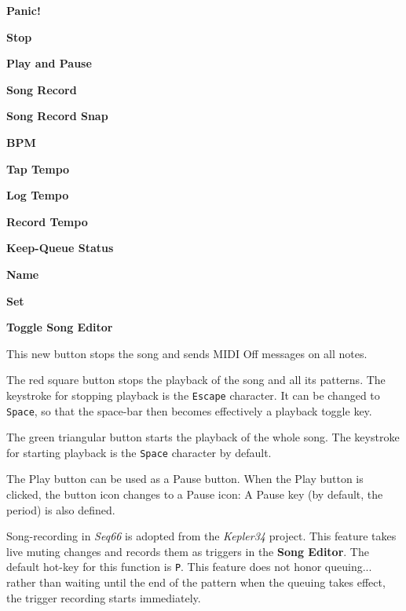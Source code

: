    \begin{enumber}
      \item \textbf{Panic!}
      \item \textbf{Stop}
      \item \textbf{Play and Pause}
      \item \textbf{Song Record}
      \item \textbf{Song Record Snap}
      \item \textbf{BPM}
      \item \textbf{Tap Tempo}
      \item \textbf{Log Tempo}
      \item \textbf{Record Tempo}
      \item \textbf{Keep-Queue Status}
      \item \textbf{Name}
      \item \textbf{Set}
      \item \textbf{Toggle Song Editor}
   \end{enumber}

   \setcounter{ItemCounter}{0}      %

   This new button stops the song and sends MIDI Off messages on all notes.

   The red square button stops the playback of the song and all its patterns.
   The keystroke for stopping playback is the \texttt{Escape} character.
   It can be changed to \texttt{Space}, so that the space-bar then becomes
   effectively a playback toggle key.

   The green triangular button starts the playback of the whole song.
   The keystroke for starting playback is the \texttt{Space} character by
   default.

   The Play button can be used as a Pause button.
   When the Play button is clicked, the button icon changes to a Pause icon:
   A Pause key (by default, the period) is also defined.

   Song-recording in \textsl{Seq66} is adopted from the
   \textsl{Kepler34} project.
   This feature takes live muting changes and records them as
   triggers in the \textbf{Song Editor}.
   The default hot-key for this function is \texttt{P}.
   This feature does not honor queuing...
   rather than waiting until the end of the pattern when the queuing takes
   effect, the trigger recording starts immediately.

